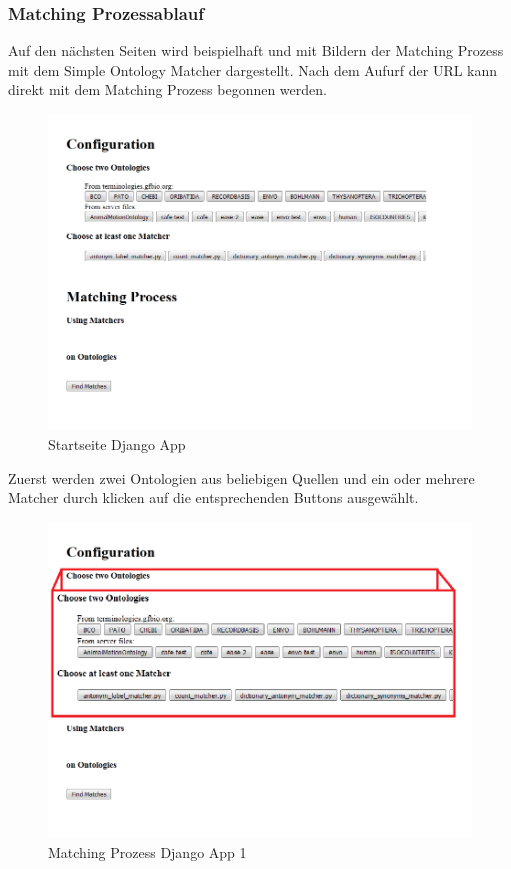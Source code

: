 		\subsubsection{Matching Prozessablauf}
		Auf den nächsten Seiten wird beispielhaft und mit Bildern der Matching Prozess
		mit dem Simple Ontology Matcher dargestellt.
		Nach dem Aufurf der URL kann direkt mit dem Matching Prozess begonnen werden.
		\begin{figure}[h!]
		\centering
		\includegraphics[width=1.0\textwidth]{pics/SimpleOntologyMatcher.png}
		\caption{Startseite Django App}
		\label{fig3}
		\end{figure}
		
		\pagebreak[4]
		Zuerst werden zwei Ontologien aus beliebigen Quellen und ein oder
		mehrere Matcher durch klicken auf die entsprechenden Buttons ausgewählt.
		\begin{figure}[h!]
		\centering
		\includegraphics[width=1.0\textwidth]{pics/SimpleOntologyMatcher-Process.png}
		\caption{Matching Prozess Django App 1}
		\label{fig4}
		\end{figure}
		
